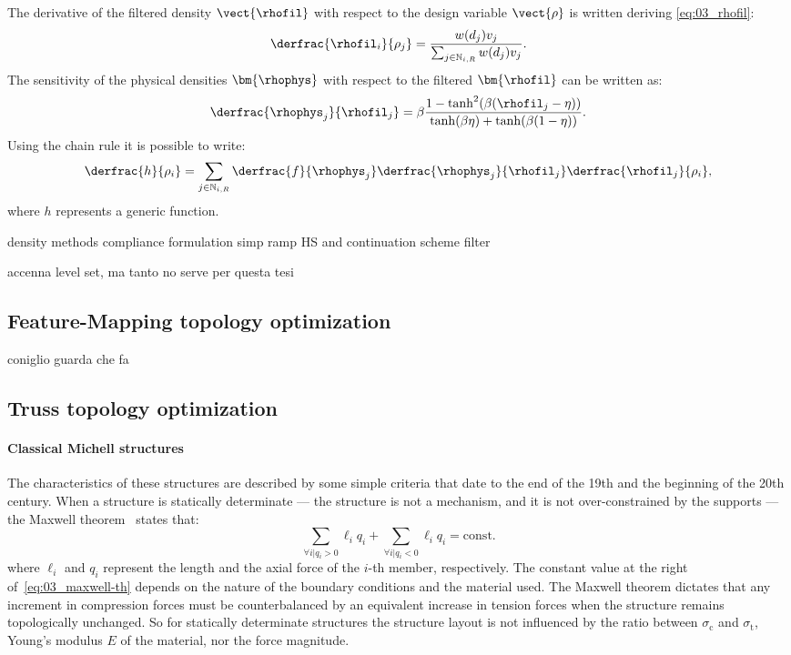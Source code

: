 The derivative of the filtered density $\vect{\rhofil}$ with respect to the design variable $\vect{\rho}$ is written deriving \eqref{eq:03_rhofil}:
\begin{equation}
    \derfrac{\rhofil_i}{\rho_j} = \frac{w(d_j)v_j}{\sum_{j \in \mathbb{N}_{i,R}} w(d_j)v_j}.
    \label{eq:03_sens_filt}
\end{equation}
The sensitivity of the physical densities $\bm{\rhophys}$ with respect to the filtered $\bm{\rhofil}$ can be written as:
\begin{equation}
    \derfrac{\rhophys_j}{\rhofil_j} = \beta \frac{1-\tanh^2(\beta(\rhofil_j-\eta))}{\tanh(\beta\eta)+\tanh(\beta(1 - \eta))}.
    \label{eq:03_sens_proj}
\end{equation}
Using the chain rule it is possible to write:
\begin{equation}
    \label{eq:03_chain}
    \derfrac{h}{\rho_i} = \sum_{j \in \mathbb{N}_{i,R}} \derfrac{f}{\rhophys_j} \derfrac{\rhophys_j}{\rhofil_j} \derfrac{\rhofil_j}{\rho_i},
\end{equation}
where $h$ represents a generic function.

density methods
compliance formulation
simp ramp HS and continuation scheme
filter

accenna level set, ma tanto no serve per questa tesi

\subsection{Feature-Mapping topology optimization}
coniglio guarda che fa

\subsection{Truss topology optimization}

\paragraph{Classical Michell structures} \label{sec:03_michell}
The characteristics of these structures are described by some simple criteria that date to the end of the 19th and the beginning of the 20th century. When a structure is statically determinate — \ie the structure is not a mechanism, and it is not over-constrained by the supports — the Maxwell theorem~ states that:
\begin{equation} \label{eq:03_maxwell-th}
    \sum_{\forall i | q_i>0}\ell_iq_i + \sum_{\forall i | q_i<0}\ell_iq_i = \textrm{const.}
\end{equation}
where $\ell_i$ and $q_i$ represent the length and the axial force of the $i$-th member, respectively. The constant value at the right of~\eqref{eq:03_maxwell-th} depends on the nature of the boundary conditions and the material used. The Maxwell theorem dictates that any increment in compression forces must be counterbalanced by an equivalent increase in tension forces when the structure remains topologically unchanged. So for statically determinate structures the structure layout is not influenced by the ratio between $\sigma_\text{c}$ and $\sigma_\text{t}$, Young's modulus $E$ of the material, nor the force magnitude.

